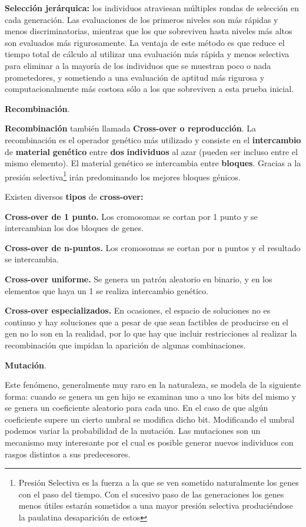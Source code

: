 \documentclass[
  a4paper,
  DIV=11,
  numbers=noendperiod]{scrreprt}
\begin{document}
\textbf{Selección jerárquica:} los individuos atraviesan múltiples
rondas de selección en cada generación. Las evaluaciones de los primeros
niveles son más rápidas y menos discriminatorias, mientras que los que
sobreviven hasta niveles más altos son evaluados más rigurosamente. La
ventaja de este método es que reduce el tiempo total de cálculo al
utilizar una evaluación más rápida y menos selectiva para eliminar a la
mayoría de los individuos que se muestran poco o nada prometedores, y
sometiendo a una evaluación de aptitud más rigurosa y computacionalmente
más costosa sólo a los que sobreviven a esta prueba inicial.

\textbf{Recombinación}.

\textbf{Recombinación} también llamada \textbf{Cross-over o
reproducción}. La recombinación es el operador genético más utilizado y
consiste en el \textbf{intercambio} de \textbf{material}
\textbf{genético} entre \textbf{dos} \textbf{individuos} al azar (pueden
ser incluso entre el mismo elemento). El material genético se
intercambia entre \textbf{bloques}. Gracias a la presión
selectiva\footnote{Presión Selectiva es la fuerza a la que se ven
  sometido naturalmente los genes con el paso del tiempo. Con el
  sucesivo paso de las generaciones los genes menos útiles estarán
  sometidos a una mayor presión selectiva produciéndose la paulatina
  desaparición de estos} irán predominando los mejores bloques génicos.

Existen diversos \textbf{tipos} de \textbf{cross-over:}

\textbf{Cross-over de 1 punto.} Los cromosomas se cortan por 1 punto y
se intercambian los dos bloques de genes.

\textbf{Cross-over de n-puntos.} Los cromosomas se cortan por n puntos y
el resultado se intercambia.

\textbf{Cross-over uniforme.} Se genera un patrón aleatorio en binario,
y en los elementos que haya un 1 se realiza intercambio genético.

\textbf{Cross-over especializados.} En ocasiones, el espacio de
soluciones no es continuo y hay soluciones que a pesar de que sean
factibles de producirse en el gen no lo son en la realidad, por lo que
hay que incluir restricciones al realizar la recombinación que impidan
la aparición de algunas combinaciones.

\textbf{Mutación}.

Este fenómeno, generalmente muy raro en la naturaleza, se modela de la
siguiente forma: cuando se genera un gen hijo se examinan uno a uno los
bits del mismo y se genera un coeficiente aleatorio para cada uno. En el
caso de que algún coeficiente supere un cierto umbral se modifica dicho
bit. Modificando el umbral podemos variar la probabilidad de la
mutación. Las mutaciones son un mecanismo muy interesante por el cual es
posible generar nuevos individuos con rasgos distintos a sus
predecesores.
\end{document}
